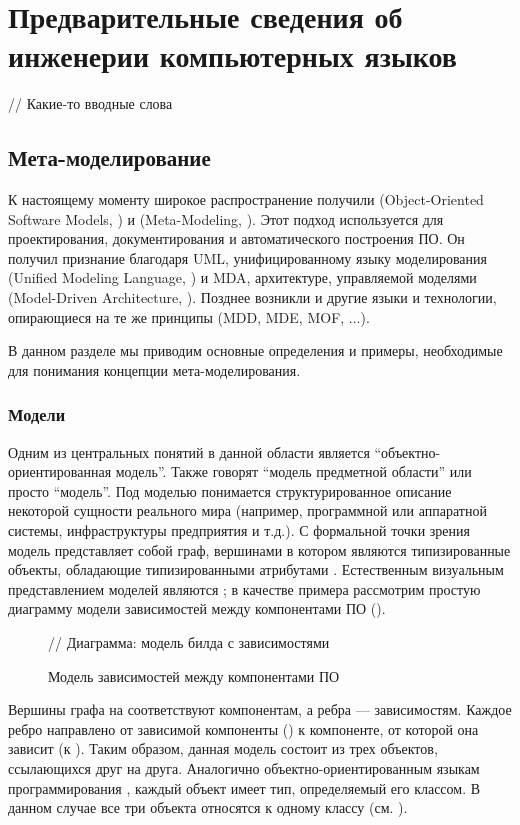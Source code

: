 \part{Предварительные сведения об инженерии компьютерных языков}\label{part1}

// Какие-то вводные слова

\chapter{Мета-моделирование}

К настоящему моменту широкое распространение получили  (Object-Oriented Software Models, \cite{OOSM}) и  (Meta-Modeling, \cite{MM}). Этот подход используется для проектирования, документирования и автоматического построения ПО. Он получил признание благодаря UML, унифицированному языку моделирования (Unified Modeling Language, \cite{UML}) и MDA, архитектуре, управляемой моделями (Model-Driven Architecture, \cite{MDA}).
Позднее возникли и другие языки и технологии, опирающиеся на те же принципы (MDD, MDE, MOF, ...).

В данном разделе мы приводим основные определения и примеры, необходимые для понимания концепции мета-моделирования. 

\section{Модели}

Одним из центральных понятий в данной области является ``объектно-ориентированная модель''.  Также говорят ``модель предметной области'' или просто ``модель''. Под моделью понимается структурированное описание некоторой сущности реального мира (например, программной или аппаратной системы, инфраструктуры предприятия и т.д.). С формальной точки зрения модель представляет собой граф, вершинами в котором являются типизированные объекты, обладающие типизированными атрибутами \cite{KM3}. Естественным визуальным представлением моделей являются ; в качестве примера рассмотрим простую диаграмму модели зависимостей между компонентами ПО ().

\begin{figure}[htbp]
// Диаграмма: модель билда с зависимостями
\caption{Модель зависимостей между компонентами ПО}\label{DiagramExample}
\end{figure}

Вершины графа на  соответствуют компонентам, а ребра --- зависимостям. Каждое ребро направлено от зависимой компоненты () к компоненте, от которой она зависит (к ). Таким образом, данная модель состоит из трех объектов, ссылающихся друг на друга. Аналогично объектно-ориентированным языкам программирования \cite{Java}, каждый объект имеет тип, определяемый его классом. В данном случае все три объекта относятся к одному классу  (см. ). 

